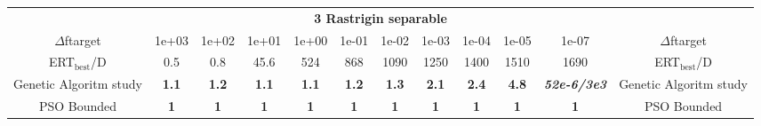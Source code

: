 \begin{tabular}{cccccccccccc}
 & \multicolumn{10}{c}{{\normalsize \textbf{3 Rastrigin separable}}}\\
$\Delta$ftarget& 1e+03& 1e+02& 1e+01& 1e+00& 1e-01& 1e-02& 1e-03& 1e-04& 1e-05& 1e-07 & $\Delta$ftarget \\
ERT$_{\textrm{best}}$/D& 0.5& 0.8& 45.6& 524& 868& 1090& 1250& 1400& 1510& 1690 & ERT$_{\textrm{best}}$/D \\
\hline
Genetic Algoritm study & \textbf{1.1} & \textbf{1.2} & \textbf{1.1} & \textbf{1.1} & \textbf{1.2} & \textbf{1.3} & \textbf{2.1} & \textbf{2.4} & \textbf{4.8} & \textbf{\textit{52e-6}\textit{/3e3}} & Genetic Algoritm study \cite{add_an_entry_for_Genetic Algoritm study_in_bbob.bib}\\
PSO Bounded & \textbf{1} & \textbf{1} & \textbf{1} & \textbf{1} & \textbf{1} & \textbf{1} & \textbf{1} & \textbf{1} & \textbf{1} & \textbf{1} & PSO Bounded \cite{add_an_entry_for_PSO Bounded_in_bbob.bib}
\end{tabular}
